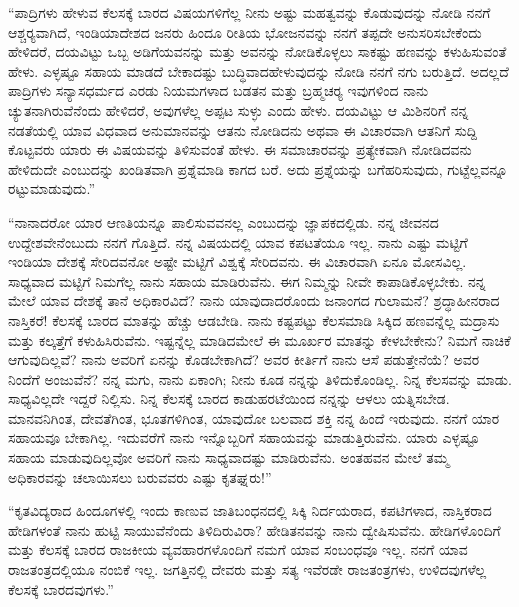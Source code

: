  “ಪಾದ್ರಿಗಳು ಹೇಳುವ ಕೆಲಸಕ್ಕೆ ಬಾರದ ವಿಷಯಗಳಿಗೆಲ್ಲ ನೀನು ಅಷ್ಟು ಮಹತ್ವವನ್ನು ಕೊಡುವುದನ್ನು ನೋಡಿ ನನಗೆ ಆಶ್ಚರ‍್ಯವಾಗಿದೆ, ಇಂಡಿಯಾದೇಶದ ಜನರು ಹಿಂದೂ ರೀತಿಯ ಭೋಜನವನ್ನು ನನಗೆ ತಪ್ಪದೇ ಅನುಸರಿಸಬೇಕೆಂದು ಹೇಳಿದರೆ, ದಯವಿಟ್ಟು ಒಬ್ಬ ಅಡಿಗೆಯವನನ್ನು ಮತ್ತು ಅವನನ್ನು ನೋಡಿಕೊಳ್ಳಲು ಸಾಕಷ್ಟು ಹಣವನ್ನು ಕಳುಹಿಸುವಂತೆ ಹೇಳು. ಎಳ್ಳಷ್ಟೂ ಸಹಾಯ ಮಾಡದೆ ಬೇಕಾದಷ್ಟು ಬುದ್ಧಿವಾದಹೇಳುವುದನ್ನು ನೋಡಿ ನನಗೆ ನಗು ಬರುತ್ತಿದೆ. ಅದಲ್ಲದೆ ಪಾದ್ರಿಗಳು ಸನ್ಯಾಸಧರ್ಮದ ಎರಡು ನಿಯಮಗಳಾದ ಬಡತನ ಮತ್ತು ಬ್ರಹ್ಮಚರ‍್ಯ ಇವುಗಳಿಂದ ನಾನು ಚ್ಯುತನಾಗಿರುವೆನೆಂದು ಹೇಳಿದರೆ, ಅವುಗಳೆಲ್ಲ ಅಪ್ಪಟ ಸುಳ್ಳು ಎಂದು ಹೇಳು. ದಯವಿಟ್ಟು ಆ ಮಿಶಿನರಿಗೆ ನನ್ನ ನಡತೆಯಲ್ಲಿ ಯಾವ ವಿಧವಾದ ಅನುಮಾನವನ್ನು ಆತನು ನೋಡಿದನು ಅಥವಾ ಈ ವಿಚಾರವಾಗಿ ಆತನಿಗೆ ಸುದ್ದಿ ಕೊಟ್ಟವರು ಯಾರು ಈ ವಿಷಯವನ್ನು ತಿಳಿಸುವಂತೆ ಹೇಳು. ಈ ಸಮಾಚಾರವನ್ನು ಪ್ರತ್ಯೇಕವಾಗಿ ನೋಡಿದವನು ಹೇಳಿದುದೇ ಎಂಬುದನ್ನು ಖಂಡಿತವಾಗಿ ಪ್ರಶ್ನೆಮಾಡಿ ಕಾಗದ ಬರೆ. ಅದು ಪ್ರಶ್ನೆಯನ್ನು ಬಗೆಹರಿಸುವುದು, ಗುಟ್ಟೆಲ್ಲವನ್ನೂ ರಟ್ಟುಮಾಡುವುದು.” 

 “ನಾನಾದರೋ‌ ಯಾರ ಆಣತಿಯನ್ನೂ ಪಾಲಿಸುವವನಲ್ಲ ಎಂಬುದನ್ನು ಜ್ಞಾಪಕದಲ್ಲಿಡು. ನನ್ನ ಜೀವನದ ಉದ್ದೇಶವೇನೆಂಬುದು ನನಗೆ ಗೊತ್ತಿದೆ. ನನ್ನ ವಿಷಯದಲ್ಲಿ ಯಾವ ಕಪಟತೆಯೂ ಇಲ್ಲ. ನಾನು ಎಷ್ಟು ಮಟ್ಟಿಗೆ ಇಂಡಿಯಾ ದೇಶಕ್ಕೆ ಸೇರಿದವನೋ ಅಷ್ಟೇ ಮಟ್ಟಿಗೆ ವಿಶ್ವಕ್ಕೆ ಸೇರಿದವನು. ಈ ವಿಚಾರವಾಗಿ ಏನೂ ಮೋಸವಿಲ್ಲ. ಸಾಧ್ಯವಾದ ಮಟ್ಟಿಗೆ ನಿಮಗೆಲ್ಲ ನಾನು ಸಹಾಯ ಮಾಡಿರುವೆನು. ಈಗ ನಿಮ್ಮನ್ನು ನೀವೇ ಕಾಪಾಡಿಕೊಳ್ಳಬೇಕು. ನನ್ನ ಮೇಲೆ ಯಾವ ದೇಶಕ್ಕೆ ತಾನೆ ಅಧಿಕಾರವಿದೆ? ನಾನು ಯಾವುದಾದರೊಂದು ಜನಾಂಗದ ಗುಲಾಮನೆ? ಶ್ರದ್ಧಾಹೀನರಾದ ನಾಸ್ತಿಕರೆ! ಕೆಲಸಕ್ಕೆ ಬಾರದ ಮಾತನ್ನು ಹೆಚ್ಚು ಆಡಬೇಡಿ. ನಾನು ಕಷ್ಟಪಟ್ಟು ಕೆಲಸಮಾಡಿ ಸಿಕ್ಕಿದ ಹಣವನ್ನೆಲ್ಲ ಮದ್ರಾಸು ಮತ್ತು ಕಲ್ಕತ್ತೆಗೆ ಕಳುಹಿಸಿರುವೆನು. ಇಷ್ಟನ್ನೆಲ್ಲ ಮಾಡಿದಮೇಲೆ ಈ ಮೂರ್ಖರ ಮಾತನ್ನು ಕೇಳಬೇಕೇನು? ನಿಮಗೆ ನಾಚಿಕೆ ಆಗುವುದಿಲ್ಲವೆ? ನಾನು ಅವರಿಗೆ ಏನನ್ನು ಕೊಡಬೇಕಾಗಿದೆ? ಅವರ ಕೀರ್ತಿಗೆ ನಾನು ಆಸೆ ಪಡುತ್ತೇನೆಯೆ? ಅವರ ನಿಂದೆಗೆ ಅಂಜುವೆನೆ? ನನ್ನ ಮಗು, ನಾನು ಏಕಾಂಗಿ; ನೀನು ಕೂಡ ನನ್ನನ್ನು ತಿಳಿದುಕೊಂಡಿಲ್ಲ. ನಿನ್ನ ಕೆಲಸವನ್ನು ಮಾಡು. ಸಾಧ್ಯವಿಲ್ಲದೇ ಇದ್ದರೆ ನಿಲ್ಲಿಸು. ನಿನ್ನ ಕೆಲಸಕ್ಕೆ ಬಾರದ ಕಾಡುಹರಟೆಯಿಂದ ನನ್ನನ್ನು ಆಳಲು ಯತ್ನಿಸಬೇಡ. ಮಾನವನಿಗಿಂತ, ದೇವತೆಗಿಂತ, ಭೂತಗಳಿಗಿಂತ, ಯಾವುದೋ ಬಲವಾದ ಶಕ್ತಿ ನನ್ನ ಹಿಂದೆ ಇರುವುದು. ನನಗೆ ಯಾರ ಸಹಾಯವೂ ಬೇಕಾಗಿಲ್ಲ. ಇದುವರೆಗೆ ನಾನು ಇನ್ನೊಬ್ಬರಿಗೆ ಸಹಾಯವನ್ನು ಮಾಡುತ್ತಿರುವೆನು. ಯಾರು ಎಳ್ಳಷ್ಟೂ ಸಹಾಯ ಮಾಡುವುದಿಲ್ಲವೋ ಅವರಿಗೆ ನಾನು ಸಾಧ್ಯವಾದಷ್ಟು ಮಾಡಿರುವೆನು. ಅಂತಹವನ ಮೇಲೆ ತಮ್ಮ ಅಧಿಕಾರವನ್ನು ಚಲಾಯಿಸಲು ಬರುವವರು ಎಷ್ಟು ಕೃತಘ್ನರು!” 

 “ಕೃತವಿದ್ಯರಾದ ಹಿಂದೂಗಳಲ್ಲಿ ಇಂದು ಕಾಣುವ ಜಾತಿಬಂಧನದಲ್ಲಿ ಸಿಕ್ಕಿ ನಿರ್ದಯರಾದ, ಕಪಟಿಗಳಾದ, ನಾಸ್ತಿಕರಾದ ಹೇಡಿಗಳಂತೆ ನಾನು ಹುಟ್ಟಿ ಸಾಯುವೆನೆಂದು ತಿಳಿದಿರುವಿರಾ? ಹೇಡಿತನವನ್ನು ನಾನು ದ್ವೇಷಿಸುವೆನು. ಹೇಡಿಗಳೊಂದಿಗೆ ಮತ್ತು ಕೆಲಸಕ್ಕೆ ಬಾರದ ರಾಜಕೀಯ ವ್ಯವಹಾರಗಳೊಂದಿಗೆ ನಮಗೆ ಯಾವ ಸಂಬಂಧವೂ ಇಲ್ಲ. ನನಗೆ ಯಾವ ರಾಜತಂತ್ರದಲ್ಲಿಯೂ ನಂಬಿಕೆ ಇಲ್ಲ. ಜಗತ್ತಿನಲ್ಲಿ ದೇವರು ಮತ್ತು ಸತ್ಯ ಇವೆರಡೇ ರಾಜತಂತ್ರಗಳು, ಉಳಿದವುಗಳೆಲ್ಲ ಕೆಲಸಕ್ಕೆ ಬಾರದವುಗಳು.” 

